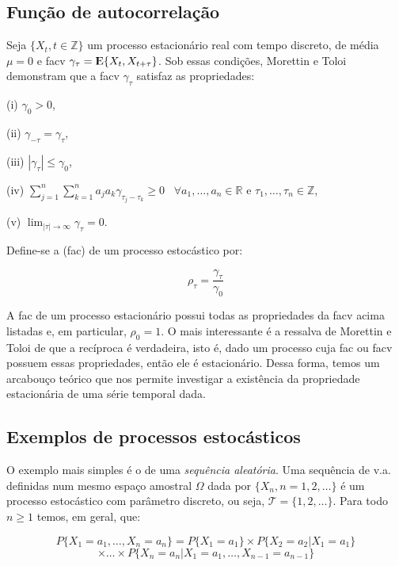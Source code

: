 \subsection{Função de autocorrelação}

Seja $\{ X_t, t \in \mathbb{Z} \}$ um processo estacionário real com tempo discreto, de média $\mu = 0$ e facv $\gamma_\tau = {\rm I\kern-.3em E}\{ X_t, X_{t+\tau} \}$. Sob essas condições, Morettin e Toloi \citep{morettin} demonstram que a facv $\gamma_\tau$ satisfaz as propriedades:

	(i) $\gamma_0 > 0$,

	(ii) $\gamma_{-\tau} = \gamma_\tau$,

	(iii) $|\gamma_\tau| \leq \gamma_0$,

	(iv) $\sum_{j=1}^n \sum_{k=1}^n a_j a_k \gamma_{\tau_j - \tau_k} \geq 0 \;\;\; \forall a_1, \ldots, a_n \in \mathbb{R}$ e $\tau_1, \ldots, \tau_n \in \mathbb{Z}$,

	(v) $\lim_{|\tau| \to \infty}  \gamma_\tau = 0$.

Define-se a  (fac) de um processo estocástico por:

\begin{equation}\label{series:2.14}
\rho_\tau = \frac{\gamma_\tau}{\gamma_0}
\end{equation}

A fac de um processo estacionário possui todas as propriedades da facv acima listadas e, em particular, $\rho_0 = 1$. O mais interessante é a ressalva de Morettin e Toloi \citep{morettin} de que a recíproca é verdadeira, isto é, dado um processo cuja fac ou facv possuem essas propriedades, então ele é estacionário. Dessa forma, temos um arcabouço teórico que nos permite investigar a existência da propriedade estacionária de uma série temporal dada.

\subsection{Exemplos de processos estocásticos}

O exemplo mais simples é o de uma \emph{sequência aleatória}. Uma sequência de v.a. definidas num mesmo espaço amostral $\Omega$ dada por $\{ X_n , n = 1, 2, \ldots \}$ é um processo estocástico com parâmetro discreto, ou seja, $\mathcal{T} = \{ 1, 2, \ldots \}$. Para todo $n \geq 1$ temos, em geral, que:

\[ P\{X_1 = a_1, \ldots, X_n = a_n\} = P\{X_1 = a_1\}\times P\{X_2 = a_2|X_1 = a_1\} \]
\[ \times\ldots\times P\{X_n = a_n|X_1 = a_1, \ldots, X_{n-1} = a_{n-1}\}\]

